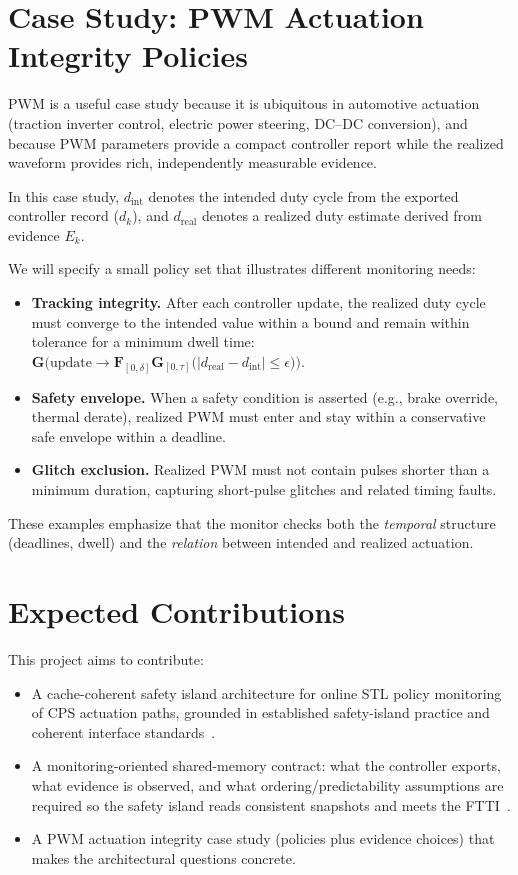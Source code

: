 \documentclass[letterpaper,twocolumn,10pt]{article}
\newcommand{\SafetyIsland}{safety island\xspace}
\newcommand{\STL}{STL\xspace}
\newcommand{\FTTI}{FTTI\xspace}
\begin{document}
\section{Case Study: PWM Actuation Integrity Policies}
PWM is a useful case study because it is ubiquitous in automotive actuation (traction inverter control, electric power steering, DC--DC conversion), and because PWM parameters provide a compact controller report while the realized waveform provides rich, independently measurable evidence.

In this case study, $d_{\text{int}}$ denotes the intended duty cycle from the exported controller record ($d_k$), and $d_{\text{real}}$ denotes a realized duty estimate derived from evidence $E_k$.

We will specify a small policy set that illustrates different monitoring needs:
\begin{itemize}
\item \textbf{Tracking integrity.} After each controller update, the realized duty cycle must converge to the intended value within a bound and remain within tolerance for a minimum dwell time:
$
\mathbf{G}\big(\mathrm{update} \rightarrow \mathbf{F}_{[0,\delta]} \mathbf{G}_{[0,\tau]}\big(|d_{\text{real}}-d_{\text{int}}|\le \epsilon\big)\big).
$
\item \textbf{Safety envelope.} When a safety condition is asserted (e.g., brake override, thermal derate), realized PWM must enter and stay within a conservative safe envelope within a deadline.
\item \textbf{Glitch exclusion.} Realized PWM must not contain pulses shorter than a minimum duration, capturing short-pulse glitches and related timing faults.
\end{itemize}
These examples emphasize that the monitor checks both the \emph{temporal} structure (deadlines, dwell) and the \emph{relation} between intended and realized actuation.

\section{Expected Contributions}
This project aims to contribute:
\begin{itemize}
\item A cache-coherent \SafetyIsland architecture for online \STL policy monitoring of CPS actuation paths, grounded in established safety-island practice and coherent interface standards~\cite{ArmAutoSolutionsOverview,NVIDIADriveFSI,ArmAMBA4,ArmAMBA5}.
\item A monitoring-oriented shared-memory contract: what the controller exports, what evidence is observed, and what ordering/predictability assumptions are required so the \SafetyIsland reads consistent snapshots and meets the \FTTI~\cite{Pulte2018SimplifyingARM,Hassan2017PredictableCoherence,Goens2023CompoundConsistency}.
\item A PWM actuation integrity case study (policies plus evidence choices) that makes the architectural questions concrete.
\end{itemize}
\end{document}

